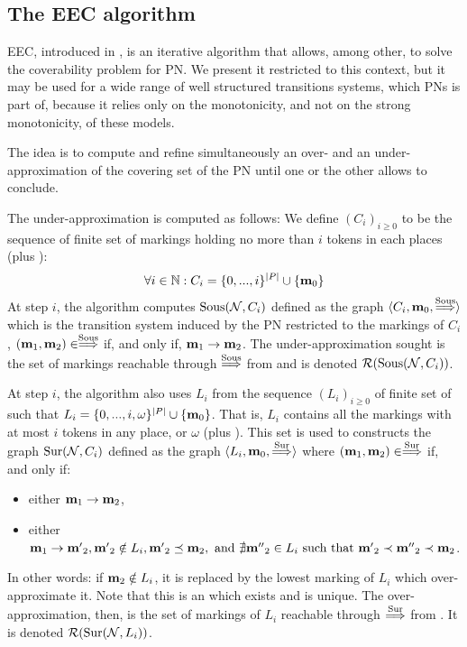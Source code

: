 \subsection{The \ac{EEC} algorithm}
\label{sec:eec}

\ac{EEC}, introduced in \cite{Geeraerts07thesis, Geeraerts06}, is an iterative algorithm that allows, among other, to solve the coverability problem for \ac{PN}.
We present it restricted to this context, but it may be used for a wide range of well structured transitions systems, which \acp{PN} is part of, because it relies only on the monotonicity, and not on the strong monotonicity, of these models.

The idea is to compute and refine simultaneously an over- and an under-approximation of the covering set of the \ac{PN} until one or the other allows to conclude.

The under-approximation is computed as follows:
We define $(C_i)_{i \geq 0}$ to be the sequence of finite set of markings holding no more than $i$ tokens in each places (plus \marqi):
\[
  \forall i \in \mathbb{N} : C_i = \{0, ..., i\}^{|P|} \cup \{\mathbf{m}_0\}
\]
At step $i$, the algorithm computes $\operatorname{Sous}(\mathcal{N}, C_i)$ defined as the graph $\langle C_i, \mathbf{m}_0, \stackrel{\operatorname{Sous}}{\Longrightarrow} \rangle$ which is the transition system induced by the \ac{PN} \tupleN restricted to the markings of $C_i$,  $(\mathbf{m}_1, \mathbf{m}_2) \in \stackrel{\operatorname{Sous}}{\Longrightarrow}$ if, and only if, $\mathbf{m}_1 \rightarrow \mathbf{m}_2$.
The under-approximation sought is the set of markings reachable through $\stackrel{\operatorname{Sous}}{\Longrightarrow}$ from \marqi and is denoted $\operatorname{\mathcal{R}}(\operatorname{Sous}(\mathcal{N}, C_i))$.

At step $i$, the algorithm also uses $L_i$ from the sequence $(L_i)_{i \geq 0}$ of finite set of \omarks such that $L_i = \{0, ..., i, \omega \}^{|P|} \cup \{\mathbf{m}_0\}$.
That is, $L_i$ contains all the markings with at most $i$ tokens in any place, or $\omega$ (plus \marqi).
This set is used to constructs the graph $\operatorname{Sur}(\mathcal{N}, C_i)$ defined as the graph $\langle L_i, \mathbf{m}_0, \stackrel{\operatorname{Sur}}{\Longrightarrow} \rangle$ where $(\mathbf{m}_1, \mathbf{m}_2) \in \stackrel{\operatorname{Sur}}{\Longrightarrow}$ if, and only if:
\begin{itemize}
  \item either $\mathbf{m}_1 \rightarrow \mathbf{m}_2$,
  \item either $\mathbf{m}_1 \rightarrow \mathbf{m'}_2, \mathbf{m'}_2 \notin L_i, \mathbf{m'}_2 \preceq \mathbf{m}_2, \text{ and } \nexists \mathbf{m''}_2 \in L_i \text{ such that } \mathbf{m'}_2 \prec \mathbf{m''}_2 \prec \mathbf{m}_2$.
\end{itemize}
In other words: if $\mathbf{m}_2 \notin L_i$, it is replaced by the lowest marking of $L_i$ which over-approximate it.
Note that this is an \omark which exists and is unique. 
The over-approximation, then, is the set of markings of $L_i$ reachable through $\stackrel{\operatorname{Sur}}{\Longrightarrow}$ from \marqi. It is denoted $\operatorname{\mathcal{R}}(\operatorname{Sur}(\mathcal{N}, L_i))$.

